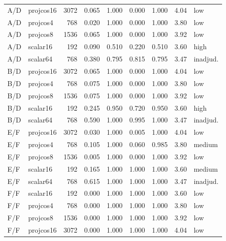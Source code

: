 \documentclass[sigplan,screen,review,anonymous]{acmart}
\begin{document}
\begin{table}[b]
\begin{tabular}{llrrrrrrl}
\addlinespace[0.25em]
A/D & projcos16 & 3072 & 0.065 & 1.000 & 0.000 & 1.000 & 4.04 & low \\
A/D & projcos4 & 768 & 0.020 & 1.000 & 0.000 & 1.000 & 3.80 & low \\
A/D & projcos8 & 1536 & 0.065 & 1.000 & 0.000 & 1.000 & 3.92 & low \\
A/D & scalar16 & 192 & 0.090 & 0.510 & 0.220 & 0.510 & 3.60 & high \\
A/D & scalar64 & 768 & 0.380 & 0.795 & 0.815 & 0.795 & 3.47 & inadjud. \\
\addlinespace[0.25em]
B/D & projcos16 & 3072 & 0.065 & 1.000 & 0.000 & 1.000 & 4.04 & low \\
B/D & projcos4 & 768 & 0.075 & 1.000 & 0.000 & 1.000 & 3.80 & low \\
B/D & projcos8 & 1536 & 0.075 & 1.000 & 0.000 & 1.000 & 3.92 & low \\
B/D & scalar16 & 192 & 0.245 & 0.950 & 0.720 & 0.950 & 3.60 & high \\
B/D & scalar64 & 768 & 0.590 & 1.000 & 0.995 & 1.000 & 3.47 & inadjud. \\
\addlinespace[0.25em]
E/F & projcos16 & 3072 & 0.030 & 1.000 & 0.005 & 1.000 & 4.04 & low \\
E/F & projcos4 & 768 & 0.105 & 1.000 & 0.060 & 0.985 & 3.80 & medium \\
E/F & projcos8 & 1536 & 0.005 & 1.000 & 0.000 & 1.000 & 3.92 & low \\
E/F & scalar16 & 192 & 0.165 & 1.000 & 1.000 & 1.000 & 3.60 & medium \\
E/F & scalar64 & 768 & 0.615 & 1.000 & 1.000 & 1.000 & 3.47 & inadjud. \\
\addlinespace[0.25em]
F/F & scalar16 & 192 & 0.000 & 1.000 & 1.000 & 1.000 & 3.60 & low \\
F/F & projcos4 & 768 & 0.000 & 1.000 & 1.000 & 1.000 & 3.80 & low \\
F/F & projcos8 & 1536 & 0.000 & 1.000 & 1.000 & 1.000 & 3.92 & low \\
F/F & projcos16 & 3072 & 0.000 & 1.000 & 1.000 & 1.000 & 4.04 & low \\
\bottomrule
\end{tabular}
\end{table}
\end{document}
